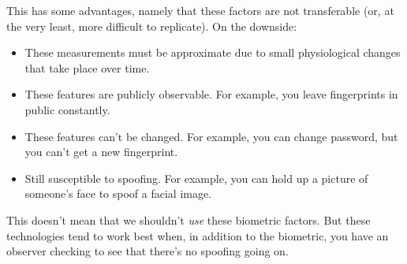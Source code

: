 \documentclass[12pt]{article}
\begin{document}
This has some advantages, namely that these factors are not transferable (or, at the very least, more difficult to replicate). On the downside:
\begin{itemize}
\item These measurements must be approximate due to small physiological changes that take place over time. 
\item These features are publicly observable. For example, you leave fingerprints in public constantly.
\item These features can't be changed. For example, you can change password, but you can't get a new fingerprint.
\item Still susceptible to spoofing. For example, you can hold up a picture of someone's face to spoof a facial image.
\end{itemize}

This doesn't mean that we shouldn't \textit{use} these biometric factors. But these technologies tend to work best when, in addition to the biometric, you have an observer checking to see that there's no spoofing going on.
\end{document}
